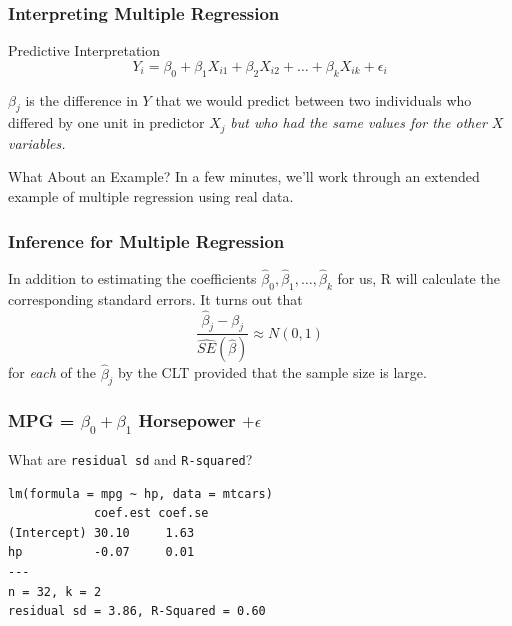\documentclass{beamer}
\begin{document}

\begin{frame}
\frametitle{Interpreting Multiple Regression}

\begin{block}{Predictive Interpretation}
$$Y_i = \beta_0 + \beta_1 X_{i1} + \beta_2 X_{i2} +  \hdots + \beta_k X_{ik} + \epsilon_i$$

$\beta_j$ is the difference in $Y$ that we would predict between two individuals who differed by one unit in predictor $X_j$ \emph{\alert{but who had the same values for the other $X$ variables.}} 

\end{block}

\begin{block}{What About an Example?}
	In a few minutes, we'll work through an extended example of multiple regression using real data.
\end{block}
\end{frame}

\begin{frame}
\frametitle{Inference for Multiple Regression}

In addition to estimating the coefficients $\widehat{\beta}_0, \widehat{\beta}_1, \hdots, \widehat{\beta}_k$ for us, R will calculate the corresponding standard errors. It turns out that
	$$\frac{\widehat{\beta}_j - \beta_j}{\widehat{SE}(\widehat{\beta})} \approx N(0,1)$$
for \emph{each} of the $\widehat{\beta}_j$ by the CLT provided that the sample size is large.

\end{frame}

\begin{frame}[fragile]
\frametitle{MPG = $\beta_0 + \beta_1$ Horsepower $+ \epsilon$}
\alert{What are \texttt{residual sd} and \texttt{R-squared}?}
\footnotesize
\begin{verbatim}
lm(formula = mpg ~ hp, data = mtcars)
            coef.est coef.se
(Intercept) 30.10     1.63  
hp          -0.07     0.01  
---
n = 32, k = 2
residual sd = 3.86, R-Squared = 0.60
\end{verbatim}
\end{frame}
\end{document}
